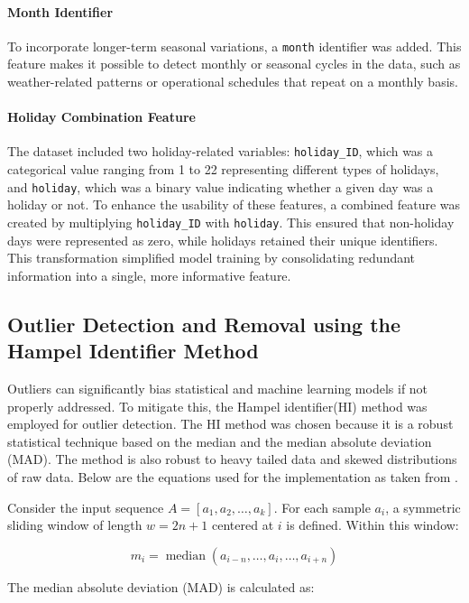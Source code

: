 \paragraph{Month Identifier}
To incorporate longer-term seasonal variations, a \texttt{month} identifier was added. This feature makes it possible to detect monthly or seasonal cycles in the data, such as weather-related patterns or operational schedules that repeat on a monthly basis.

\paragraph{Holiday Combination Feature}
The dataset included two holiday-related variables: \texttt{holiday\_ID}, which was a categorical value ranging from 1 to 22 representing different types of holidays, and \texttt{holiday}, which was a binary value indicating whether a given day was a holiday or not. To enhance the usability of these features, a combined feature was created by multiplying \texttt{holiday\_ID} with \texttt{holiday}. This ensured that non-holiday days were represented as zero, while holidays retained their unique identifiers. This transformation simplified model training by consolidating redundant information into a single, more informative feature.

\subsection{Outlier Detection and Removal using the Hampel Identifier Method}
Outliers can significantly bias statistical and machine learning models if not properly addressed. To mitigate this, the Hampel identifier(HI) method was employed for outlier detection. The HI method was chosen because it is a robust statistical technique based on the median and the median absolute deviation (MAD)\cite{hiceemdanQteg}. The method is also robust to heavy tailed data and skewed distributions of raw data. Below are the equations used for the implementation as taken from \cite{hiceemdanQteg}.

Consider the input sequence \(A = [a_1, a_2, \ldots, a_k]\). For each sample \(a_i\), a symmetric sliding window of length \(w = 2n + 1\) centered at \(i\) is defined. Within this window:

\[
m_i = \operatorname{median}(a_{i-n}, \ldots, a_i, \ldots, a_{i+n})
\tag{1}
\]

The median absolute deviation (MAD) is calculated as:


